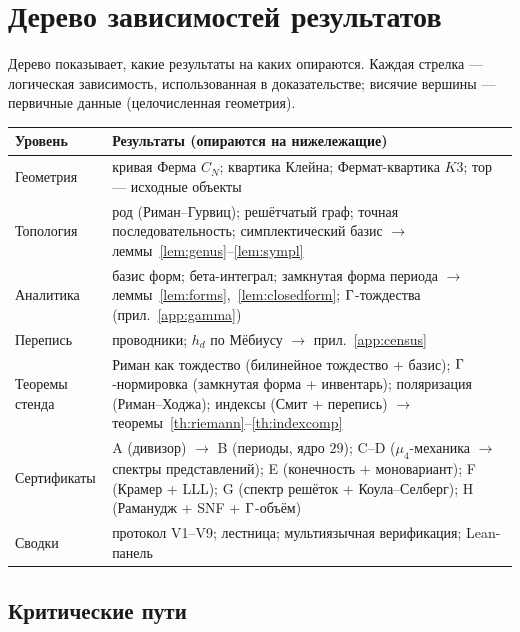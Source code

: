 
\section{Дерево зависимостей результатов}\label{app:tree}

Дерево показывает, какие результаты на каких опираются. Каждая
стрелка --- логическая зависимость, использованная в доказательстве;
висячие вершины --- первичные данные (целочисленная геометрия).

\begin{center}
\small
\begin{tabularx}{\textwidth}{@{}l >{\raggedright\arraybackslash}X@{}}
\toprule
Уровень & Результаты (опираются на нижележащие) \\
\midrule
Геометрия & кривая Ферма $C_N$; квартика Клейна; Фермат-квартика
$K3$; тор --- исходные объекты \\
Топология & род (Риман--Гурвиц); решётчатый граф; точная
последовательность; симплектический базис
$\to$ леммы~\ref{lem:genus}--\ref{lem:sympl} \\
Аналитика & базис форм; бета-интеграл; замкнутая форма периода
$\to$ леммы~\ref{lem:forms},~\ref{lem:closedform};
$\Gamma$-тождества (прил.~\ref{app:gamma}) \\
Перепись & проводники; $h_d$ по Мёбиусу
$\to$ прил.~\ref{app:census} \\
Теоремы стенда & Риман как тождество
(билинейное тождество + базис);
$\Gamma$-нормировка (замкнутая форма + инвентарь);
поляризация (Риман--Ходжа);
индексы (Смит + перепись)
$\to$ теоремы~\ref{th:riemann}--\ref{th:indexcomp} \\
Сертификаты & A (дивизор) $\to$ B (периоды, ядро $29$);
C--D ($\mu_4$-механика $\to$ спектры представлений);
E (конечность + моновариант);
F (Крамер + LLL);
G (спектр решёток + Коула--Селберг);
H (Раманудж + SNF + $\Gamma$-объём) \\
Сводки & протокол V1--V9; лестница; мультиязычная верификация;
Lean-панель \\
\bottomrule
\end{tabularx}
\end{center}

\subsection{Критические пути}

